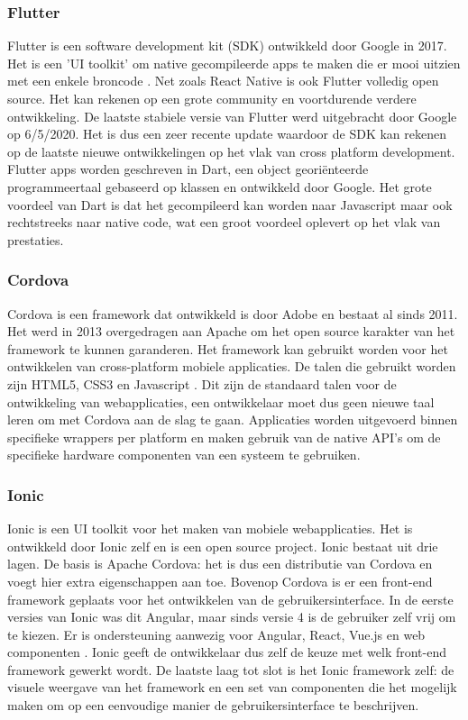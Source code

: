\subsubsection{Flutter}
\label{subsubsec:Flutter}

Flutter is een software development kit (SDK) ontwikkeld door Google in 2017. Het is een 'UI toolkit' om native gecompileerde apps te maken die er mooi uitzien met een enkele broncode \autocite{Google2020}. Net zoals React Native is ook Flutter volledig open source. Het kan rekenen op een grote community en voortdurende verdere ontwikkeling. De laatste stabiele versie van Flutter werd uitgebracht door Google op 6/5/2020. Het is dus een zeer recente update waardoor de SDK kan rekenen op de laatste nieuwe ontwikkelingen op het vlak van cross platform development. Flutter apps worden geschreven in Dart, een object georiënteerde programmeertaal gebaseerd op klassen en ontwikkeld door Google. Het grote voordeel van Dart is dat het gecompileerd kan worden naar Javascript maar ook rechtstreeks naar native code, wat een groot voordeel oplevert op het vlak van prestaties.

\subsubsection{Cordova}
\label{subsubsec:Cordova}

Cordova is een framework dat ontwikkeld is door Adobe en bestaat al sinds 2011. Het werd in 2013 overgedragen aan Apache om het open source karakter van het framework te kunnen garanderen. Het framework kan gebruikt worden voor het ontwikkelen van cross-platform mobiele applicaties. De talen die gebruikt worden zijn HTML5, CSS3 en Javascript \autocite{Apache2020}. Dit zijn de standaard talen voor de ontwikkeling van webapplicaties, een ontwikkelaar moet dus geen nieuwe taal leren om met Cordova aan de slag te gaan. Applicaties worden uitgevoerd binnen specifieke wrappers per platform en maken gebruik van de native API's om de specifieke hardware componenten van een systeem te gebruiken.

\subsubsection{Ionic}
\label{subsubsec:Ionic}

Ionic is een UI toolkit voor het maken van mobiele webapplicaties. Het is ontwikkeld door Ionic zelf en is een open source project. Ionic bestaat uit drie lagen. De basis is Apache Cordova: het is dus een distributie van Cordova en voegt hier extra eigenschappen aan toe. Bovenop Cordova is er een front-end framework geplaats voor het ontwikkelen van de gebruikersinterface. In de eerste versies van Ionic was dit Angular, maar sinds versie 4 is de gebruiker zelf vrij om te kiezen. Er is ondersteuning aanwezig voor Angular, React, Vue.js en web componenten \autocite{Schiemann2019}. Ionic geeft de ontwikkelaar dus zelf de keuze met welk front-end framework gewerkt wordt. De laatste laag tot slot is het Ionic framework zelf: de visuele weergave van het framework en een set van componenten die het mogelijk maken om op een eenvoudige manier de gebruikersinterface te beschrijven.

